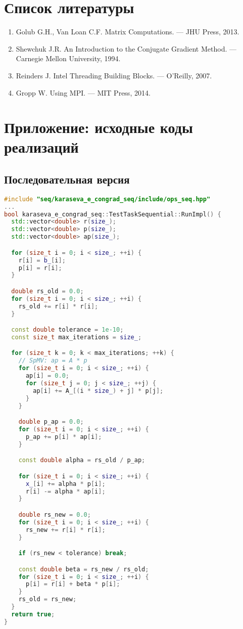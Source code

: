 \documentclass[12pt]{article}
\begin{document}
\section{Список литературы}
\begin{enumerate}
    \item Golub G.H., Van Loan C.F. Matrix Computations. — JHU Press, 2013.
    \item Shewchuk J.R. An Introduction to the Conjugate Gradient Method. — Carnegie Mellon University, 1994.
    \item Reinders J. Intel Threading Building Blocks. — O’Reilly, 2007.
    \item Gropp W. Using MPI. — MIT Press, 2014.
\end{enumerate}

\newpage
\appendix
\section{Приложение: исходные коды реализаций}

\subsection{Последовательная версия}
\begin{lstlisting}[language=C++]
#include "seq/karaseva_e_congrad_seq/include/ops_seq.hpp"
...
bool karaseva_e_congrad_seq::TestTaskSequential::RunImpl() {
  std::vector<double> r(size_);
  std::vector<double> p(size_);
  std::vector<double> ap(size_);

  for (size_t i = 0; i < size_; ++i) {
    r[i] = b_[i];
    p[i] = r[i];
  }

  double rs_old = 0.0;
  for (size_t i = 0; i < size_; ++i) {
    rs_old += r[i] * r[i];
  }

  const double tolerance = 1e-10;
  const size_t max_iterations = size_;

  for (size_t k = 0; k < max_iterations; ++k) {
    // SpMV: ap = A * p
    for (size_t i = 0; i < size_; ++i) {
      ap[i] = 0.0;
      for (size_t j = 0; j < size_; ++j) {
        ap[i] += A_[(i * size_) + j] * p[j];
      }
    }

    double p_ap = 0.0;
    for (size_t i = 0; i < size_; ++i) {
      p_ap += p[i] * ap[i];
    }

    const double alpha = rs_old / p_ap;

    for (size_t i = 0; i < size_; ++i) {
      x_[i] += alpha * p[i];
      r[i] -= alpha * ap[i];
    }

    double rs_new = 0.0;
    for (size_t i = 0; i < size_; ++i) {
      rs_new += r[i] * r[i];
    }

    if (rs_new < tolerance) break;

    const double beta = rs_new / rs_old;
    for (size_t i = 0; i < size_; ++i) {
      p[i] = r[i] + beta * p[i];
    }
    rs_old = rs_new;
  }
  return true;
}
\end{lstlisting}
\end{document}
